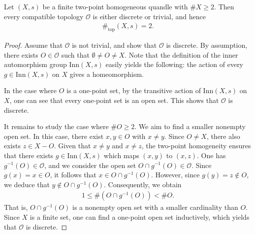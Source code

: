 \documentclass[10pt,a4paper]{amsart}
\begin{document}
\begin{Thm} 
Let $(X,s)$ be a finite two-point homogeneous quandle with $\# X \geq 2$. 
Then every compatible topology $\mathcal{O}$ is either discrete or trivial, and hence 
\begin{align*} 
\#_{\mathrm{top}} (X,s) = 2 . 
\end{align*} 
\end{Thm} 

\begin{proof} 
Assume that $\mathcal{O}$ is not trivial, and show that $\mathcal{O}$ is discrete. 
By assumption, 
there exists $O \in \mathcal{O}$ such that $\emptyset \neq O \neq X$. 
Note that the definition of the inner automorphism group $\mathrm{Inn}(X,s)$ easily yields the following: 
the action of every $g \in \mathrm{Inn}(X,s)$ on $X$ gives a homeomorphism. 

In the case where %
$O$ is a one-point set, 
by the transitive action of $\mathrm{Inn}(X,s)$ on $X$, 
one can see that every one-point set is an open set. 
This shows that $\mathcal{O}$ is discrete. 

It remains to study the case where %
$\# O \geq 2$. 
We aim to find a smaller nonempty open set. 
In this case, there exist $x,y \in O$ with $x \neq y$. 
Since $O \neq X$, there also exists $z \in X - O$. 
Given that $x \neq y$ and $x \neq z$, 
the two-point homogeneity ensures that there exists $g \in \mathrm{Inn}(X,s)$ which maps $(x,y)$ to $(x,z)$. 
One has $g^{-1}(O) \in \mathcal{O}$, 
and we consider the open set $O \cap g^{-1}(O) \in \mathcal{O}$. 
Since $g(x) = x \in O$, it follows that $x \in O \cap g^{-1}(O)$. 
However, since $g(y) = z \notin O$, we deduce that $y \notin O \cap g^{-1}(O)$. 
Consequently, we obtain 
\begin{align*} 
1 \leq \# (O \cap g^{-1}(O)) < \# O . 
\end{align*} 
That is, $O \cap g^{-1}(O)$ is a nonempty open set with a smaller cardinality than $O$. 
Since $X$ is a finite set, 
one can find a one-point open set inductively, 
which yields that $\mathcal{O}$ is discrete. 
\end{proof} 
\end{document}
